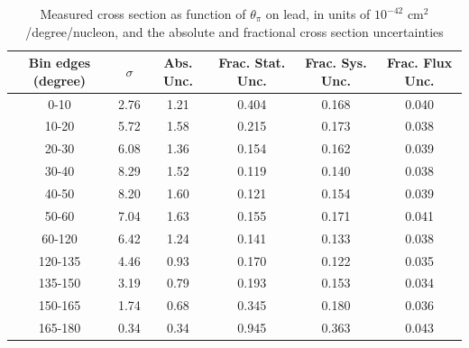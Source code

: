 \documentclass[../main.tex]{subfiles}
\begin{document}
\pagebreak
\begin{turnpage}
\end{turnpage}
\begin{table}
  \centering
  \renewcommand{\arraystretch}{1.15}
  \caption{Measured cross section as function of $\theta_{\pi}$ on lead, in units of $10^{-42}$ $\text{cm}^2$/degree/nucleon, and the absolute and fractional cross section uncertainties}
    \begin{tabular}{c||c|c||c|c|c}
      Bin edges (degree) &  $\sigma$  &  Abs. Unc.  &  Frac. Stat. Unc.  &  Frac. Sys. Unc.  &  Frac. Flux Unc. \\
      \hline
      \hline
      0-10 & 2.76 & 1.21 & 0.404 & 0.168 & 0.040\\
      10-20 & 5.72 & 1.58 & 0.215 & 0.173 & 0.038\\
      20-30 & 6.08 & 1.36 & 0.154 & 0.162 & 0.039\\
      30-40 & 8.29 & 1.52 & 0.119 & 0.140 & 0.038\\
      40-50 & 8.20 & 1.60 & 0.121 & 0.154 & 0.039\\
      50-60 & 7.04 & 1.63 & 0.155 & 0.171 & 0.041\\
      60-120 & 6.42 & 1.24 & 0.141 & 0.133 & 0.038\\
      120-135 & 4.46 & 0.93 & 0.170 & 0.122 & 0.035\\
      135-150 & 3.19 & 0.79 & 0.193 & 0.153 & 0.034\\
      150-165 & 1.74 & 0.68 & 0.345 & 0.180 & 0.036\\
      165-180 & 0.34 & 0.34 & 0.945 & 0.363 & 0.043
    \end{tabular}
  \label{tbl:datanucleonnuc82pion_thetaa}
\end{table}
\pagebreak
\end{document}
